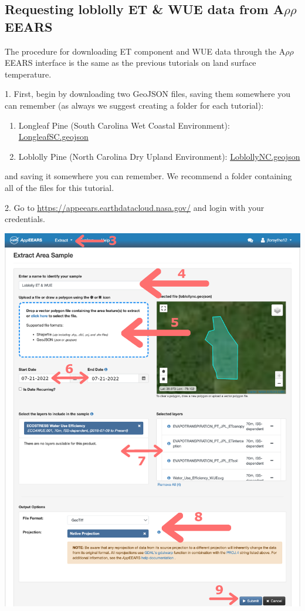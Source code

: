 \documentclass[oneside,a4paper,11pt,explicit]{book}
\begin{document}
\subsection{Requesting loblolly ET \& WUE data from A$\rho\rho$EEARS}

The procedure for downloading ET component and WUE data through the A$\rho\rho$EEARS interface is the same as the previous tutorials on land surface temperature.

1. First, begin by downloading two GeoJSON files, saving them somewhere you can remember (as always we suggest creating a folder for each tutorial):

\begin{enumerate}
	\item Longleaf Pine (South Carolina Wet Coastal Environment): \href{https://jeremydforsythe.github.io/icecream-tutorials/Tutorial7_Evapotranspiration2/LongleafSC Shapefile/LongleafSC.geojson}{LongleafSC.geojson}
	\item Loblolly Pine (North Carolina Dry Upland Environment): \href{https://jeremydforsythe.github.io/icecream-tutorials/Tutorial7_Evapotranspiration2/LoblollyNC Shapefile/LoblollyNC.geojson}{LoblollyNC.geojson}
\end{enumerate}
 and saving it somewhere you can remember. We recommend a folder containing all of the files for this tutorial. 


2. Go to \href{https://appeears.earthdatacloud.nasa.gov/}{https://appeears.earthdatacloud.nasa.gov/} and login with your credentials. 

\centerline{\includegraphics[width=.6\textwidth]{WUERequest.png}}
\end{document}
